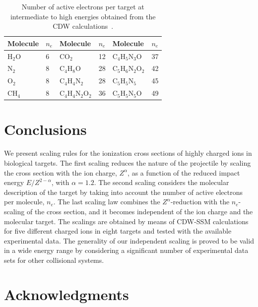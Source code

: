 \documentclass[10pt,showpacs,showkeys,twocolumn]{revtex4-1}
\begin{document}
\begin{table}[t]
\begin{center}
\begin{tabular}{|ll|ll|ll|}
\hline
 Molecule & $n_e$ & Molecule          & $n_e$ & Molecule          & $n_e$ \\
\hline
 H$_2$O   & 6  & CO$_2$               & 12 & C$_4$H$_5$N$_3$O     & 37   \\ 
 N$_2$    & 8  & C$_4$H$_8$O          & 28 & C$_5$H$_6$N$_2$O$_2$ & 42   \\ 
 O$_2$    & 8  & C$_4$H$_4$N$_2$      & 28 & C$_5$H$_5$N$_5$      & 45   \\ 
 CH$_4$   & 8  & C$_4$H$_4$N$_2$O$_2$ & 36 & C$_5$H$_5$N$_5$O     & 49   \\ 
 \hline
\end{tabular}
\caption{Number of active electrons per target at intermediate to high 
energies obtained from the CDW calculations~\cite{MendezJPB20}.}
\label{nn}
\end{center}
\vspace{-0.75cm}
\end{table}

\section{Conclusions}

We present scaling rules for the ionization
cross sections of highly charged ions in biological targets. The first
scaling reduces the nature of the projectile by scaling the cross 
section with the ion charge, $Z^{\alpha}$, as a function of the reduced 
impact energy $E/Z^{2-\alpha}$, with $\alpha=1.2$. The second scaling 
considers the molecular description of the target by taking into 
account the number of active electrons per molecule, $n_e$. The last 
scaling law combines the $Z^{\alpha}$-reduction with the $n_e$-scaling 
of the cross section, and it becomes independent of the ion charge and the 
molecular target. The scalings are obtained by means of CDW-SSM 
calculations for five different charged ions in eight targets and 
tested with the available experimental data. The generality of our 
independent scaling is proved to be valid in a wide energy range by 
considering a significant number of experimental data sets for other 
collisional systems.

\section{Acknowledgments}
\end{document}
